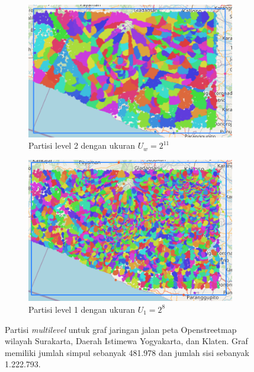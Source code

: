 \begin{figure}[h]
   
    \begin{subfigure}[b]{0.45\textwidth}
        \centering
        \includegraphics[width=\linewidth]{figures/partition_level_2.png}
        \caption{Partisi level 2 dengan ukuran $U_w=2^{11}$}
        \label{fig:c}
    \end{subfigure}
    \hfill
    \begin{subfigure}[b]{0.45\textwidth}
        \centering
        \includegraphics[width=\linewidth]{figures/partition_level_1.png}
        \caption{Partisi level 1 dengan ukuran $U_1=2^{8}$}
        \label{fig:d}
    \end{subfigure}

    \caption{Partisi \textit{multilevel} untuk graf jaringan jalan peta Openstreetmap wilayah Surakarta, Daerah Istimewa Yogyakarta, dan Klaten. Graf memiliki jumlah simpul sebanyak 481.978 dan jumlah sisi sebanyak 1.222.793.}
    \label{fig:mlp-inertial-flow}
\end{figure}

